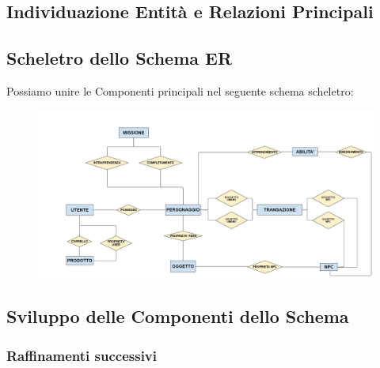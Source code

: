\documentclass[12pt]{article} %
\begin{document}
		\subsection{Individuazione Entità e Relazioni Principali}

		

		\begin{landscape}

		\subsection{Scheletro dello Schema ER}
			Possiamo unire le Componenti principali nel seguente schema scheletro:

			\begin{figure}[H]
			\centering
			\includegraphics[width=\linewidth]{./immagini/SCHEMASCHELETRO.png}
		\end{figure}

		\end{landscape}

\newpage
		\subsection{Sviluppo delle Componenti dello Schema}

		

			\subsubsection{Raffinamenti successivi}

				

\end{document}
